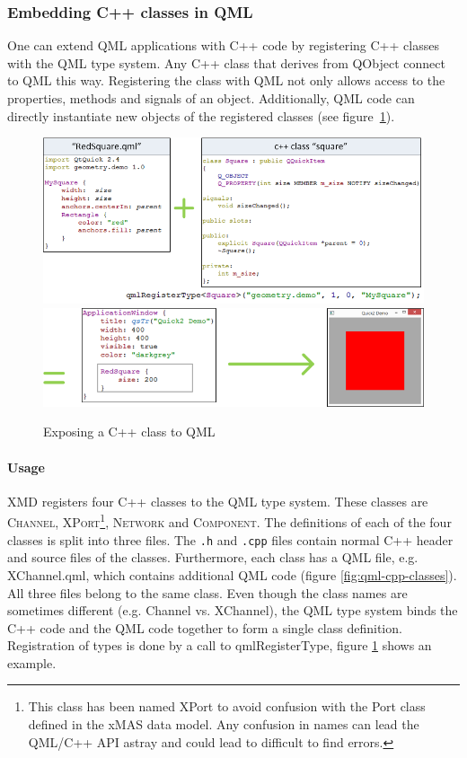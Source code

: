 \subsubsection{Embedding C++ classes in QML}

One can extend QML applications with C++ code by registering C++ classes
with the QML type system. Any C++ class that derives from QObject connect to QML this way.
Registering the class with QML not only allows access to the properties,
methods and signals of an object. Additionally, QML code can directly instantiate
new objects of the registered classes (see figure~\ref{fig:register-qml}).

\begin{figure}
    \includegraphics[width=\textwidth]{qml1}
    \includegraphics[width=\textwidth]{qml2}
    \caption{Exposing a C++ class to QML}
    \label{fig:register-qml}
\end{figure}

\paragraph{Usage}XMD registers four C++ classes to the QML type system. These classes
are \textsc{Channel}, \textsc{XPort}\footnote{This class has been named XPort to
avoid confusion with the Port class defined in the xMAS data model. Any confusion
in names can lead the QML/C++ API astray and could lead to difficult to find errors.}, 
\textsc{Network} and \textsc{Component}. 
The definitions of each of the four classes is split into three files. 
The {\tt .h} and {\tt .cpp} files contain normal C++ header and source files of the 
classes. Furthermore, each class has a QML file, e.g. XChannel.qml, which contains
additional QML code (figure \ref{fig:qml-cpp-classes}). All three files belong to
the same class. Even though the class names are sometimes different (e.g. Channel vs.
XChannel), the QML type system binds the C++ code and the QML code together to form a
single class definition. Registration of types is done by a call to qmlRegisterType,
figure \ref{fig:register-qml} shows an example.

